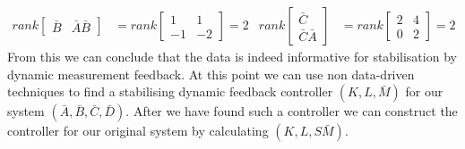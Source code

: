 \begin{align*}
rank\begin{bmatrix} \bar{B}&\bar{A}\bar{B} \end{bmatrix} &= rank\begin{bmatrix} 1&1\\-1&-2 \end{bmatrix} =2 &
rank\begin{bmatrix} \bar{C}\\\bar{C}\bar{A} \end{bmatrix} &= rank\begin{bmatrix} 2&4\\0&2 \end{bmatrix} = 2
\end{align*}
From this we can conclude that the data is indeed informative for stabilisation by dynamic measurement feedback. At this point we can use non data-driven techniques to find a stabilising dynamic feedback controller $(K,L,\bar{M})$ for our system $(\bar{A},\bar{B},\bar{C},\bar{D})$. After we have found such a controller we can construct the controller for our original system by calculating $(K,L,S\bar{M})$.












